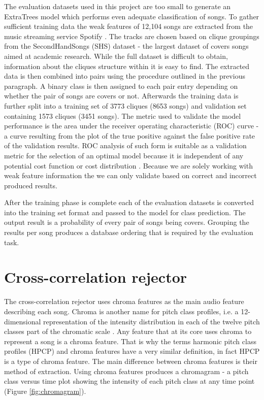 The evaluation datasets used in this project are too small to generate an
ExtraTrees model which performs even adequate classification of songs. To gather
sufficient training data the weak features of 12,104 songs are extracted from
the music streaming service Spotify \cite{spotify}. The tracks are chosen based
on clique groupings from the SecondHandSongs (SHS) \cite{shs} dataset - the
largest dataset of covers songs aimed at academic research. While the full
dataset is difficult to obtain, information about the cliques structure within
it is easy to find. The extracted data is then combined into pairs using the
procedure outlined in the previous paragraph. A binary class is then assigned to
each pair entry depending on whether the pair of songs are covers or not.
Afterwards the training data is further split into a training set of 3773
cliques (8653 songs) and validation set containing 1573 cliques (3451 songs).
The metric used to validate the model performance is the area under the receiver
operating characteristic (ROC) curve - a curve resulting from the plot of the
true positive against the false positive rate of the validation results. ROC
analysis of such form is suitable as a validation metric for the selection of an
optimal model because it is independent of any potential cost function or cost
distribution \cite{wiki:roc}. Because we are solely working with weak feature
information the we can only validate based on correct and incorrect produced results.

After the training phase is complete each of the evaluation datasets is
converted into the training set format and passed to the model for class
prediction. The output result is a probability of every pair of songs being
covers. Grouping the results per song produces a database ordering that is
required by the evaluation task.

\section{Cross-correlation rejector} 
\label{sec:weakfeatures}
The cross-correlation rejector uses chroma features as the main audio feature
describing each song. Chroma is another name for pitch class profiles, i.e. a
12-dimensional representation of the intensity distribution in each of the
twelve pitch classes part of the chromatic scale \cite{fujishima1999real}. Any
feature that at its core uses chroma to represent a song is a chroma feature.
That is why the terms harmonic pitch class profiles (HPCP) and chroma features
have a very similar definition, in fact HPCP is a type of chroma feature. The
main difference between chroma features is their method of extraction. Using
chroma features produces a chromagram - a pitch class versus time plot showing
the intensity of each pitch class at any time point (Figure
\ref{fig:chromagram}).

